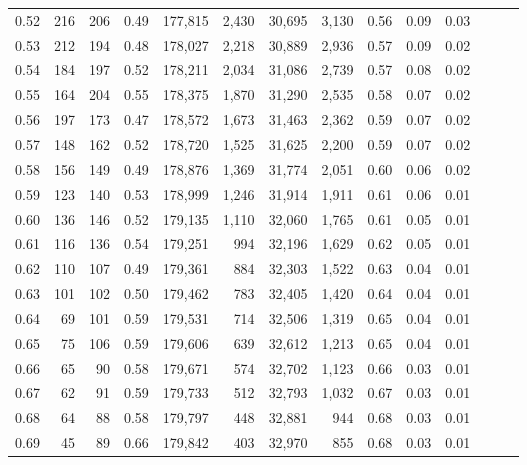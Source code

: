 \begin{tabular}{rrrrrrrrrrrrrr}
0.52 &     216 &    206 &  0.49 &  177,815 &    2,430 &  30,695 &   3,130 &  0.56 &  0.09 &      0.03 \\
0.53 &     212 &    194 &  0.48 &  178,027 &    2,218 &  30,889 &   2,936 &  0.57 &  0.09 &      0.02 \\
0.54 &     184 &    197 &  0.52 &  178,211 &    2,034 &  31,086 &   2,739 &  0.57 &  0.08 &      0.02 \\
0.55 &     164 &    204 &  0.55 &  178,375 &    1,870 &  31,290 &   2,535 &  0.58 &  0.07 &      0.02 \\
0.56 &     197 &    173 &  0.47 &  178,572 &    1,673 &  31,463 &   2,362 &  0.59 &  0.07 &      0.02 \\
0.57 &     148 &    162 &  0.52 &  178,720 &    1,525 &  31,625 &   2,200 &  0.59 &  0.07 &      0.02 \\
0.58 &     156 &    149 &  0.49 &  178,876 &    1,369 &  31,774 &   2,051 &  0.60 &  0.06 &      0.02 \\
0.59 &     123 &    140 &  0.53 &  178,999 &    1,246 &  31,914 &   1,911 &  0.61 &  0.06 &      0.01 \\
0.60 &     136 &    146 &  0.52 &  179,135 &    1,110 &  32,060 &   1,765 &  0.61 &  0.05 &      0.01 \\
0.61 &     116 &    136 &  0.54 &  179,251 &      994 &  32,196 &   1,629 &  0.62 &  0.05 &      0.01 \\
0.62 &     110 &    107 &  0.49 &  179,361 &      884 &  32,303 &   1,522 &  0.63 &  0.04 &      0.01 \\
0.63 &     101 &    102 &  0.50 &  179,462 &      783 &  32,405 &   1,420 &  0.64 &  0.04 &      0.01 \\
0.64 &      69 &    101 &  0.59 &  179,531 &      714 &  32,506 &   1,319 &  0.65 &  0.04 &      0.01 \\
0.65 &      75 &    106 &  0.59 &  179,606 &      639 &  32,612 &   1,213 &  0.65 &  0.04 &      0.01 \\
0.66 &      65 &     90 &  0.58 &  179,671 &      574 &  32,702 &   1,123 &  0.66 &  0.03 &      0.01 \\
0.67 &      62 &     91 &  0.59 &  179,733 &      512 &  32,793 &   1,032 &  0.67 &  0.03 &      0.01 \\
0.68 &      64 &     88 &  0.58 &  179,797 &      448 &  32,881 &     944 &  0.68 &  0.03 &      0.01 \\
0.69 &      45 &     89 &  0.66 &  179,842 &      403 &  32,970 &     855 &  0.68 &  0.03 &      0.01 \\

\end{tabular}
